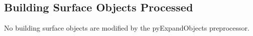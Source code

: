 \subsection{Building Surface Objects Processed}\label{pyexpandobjects-building-surface-objects-processed}

No building surface objects are modified by the pyExpandObjects preprocessor.